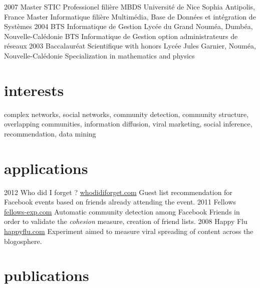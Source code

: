 \documentclass[]{roger-cv}
\begin{document}
\begin{entrylist}
  \entry
    {2007}
    {}
    {Master STIC Professionel {\normalfont filière MBDS}}
    {Université de Nice Sophia Antipolis, France}
    {Master Informatique filière Multimédia, Base de Données et intégration de Systèmes}
  \entry
    {2004}
    {}
    {BTS Informatique de Gestion}
    {Lycée du Grand Nouméa, Dumbéa, Nouvelle-Calédonie}
    {BTS Informatique de Gestion option administrateurs de réseaux}
  \entry
    {2003}
    {}
    {Baccalauréat Scientifique with honors}
    {Lycée Jules Garnier, Nouméa, Nouvelle-Calédonie}
    {Specialization in mathematics and physics}
\end{entrylist}

\section{interests}

complex networks, social networks, community detection, community structure,
overlapping communities, information diffusion, viral marketing, social
inference, recommendation, data mining

\section{applications}

\begin{entrylist}
  \entry
    {2012}
    {}
    {Who did I forget ?}
    {\href{http://whodidiforget.com}{whodidiforget.com}}
    {Guest list recommendation for Facebook events based on friends already attending the event.}
  \entry
    {2011}
    {}
    {Fellows}
    {\href{http://fellows-exp.com}{fellows-exp.com}}
    {Automatic community detection among Facebook Friends in order to validate the \emph{cohesion} measure, creation of friend lists.}
  \entry
    {2008}
    {}
    {Happy Flu}
    {\href{http://happyflu.com}{happyflu.com}}
    {Experiment aimed to measure viral spreading of content across the blogosphere.}
\end{entrylist}

\section{publications}


\begin{refsection}
  \nocite{*}
  \printbibliography[sorting=chronological, type=inproceedings, title={international peer-reviewed conferences/proceedings}, notkeyword={france}, heading=subbibliography]
\end{refsection}
\begin{refsection}
  \nocite{*}
  \printbibliography[sorting=chronological, type=inproceedings, title={local peer-reviewed conferences/proceedings}, keyword={france}, heading=subbibliography]
\end{refsection}
\end{document}
